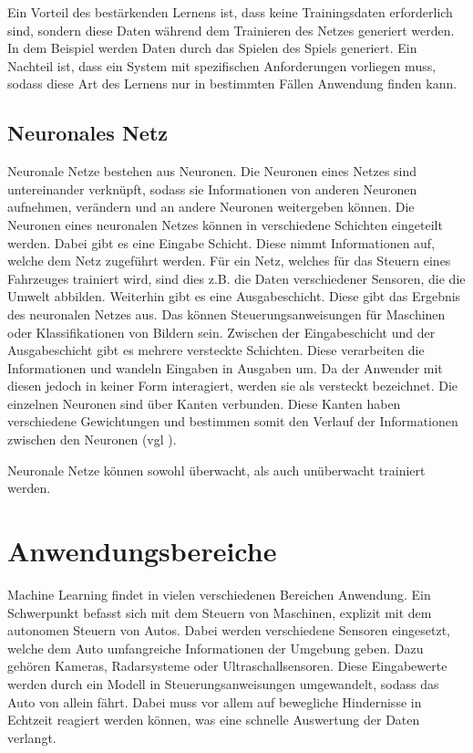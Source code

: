 Ein Vorteil des bestärkenden Lernens ist, dass keine Trainingsdaten erforderlich sind, sondern diese Daten während dem Trainieren des Netzes generiert werden. In dem Beispiel werden Daten durch das Spielen des Spiels generiert. Ein Nachteil ist, dass ein System mit spezifischen Anforderungen vorliegen muss, sodass diese Art des Lernens nur in bestimmten Fällen Anwendung finden kann.

\subsection{Neuronales Netz}
\label{neuronalesNetz}
Neuronale Netze bestehen aus Neuronen. Die Neuronen eines Netzes sind untereinander verknüpft, sodass sie Informationen von anderen Neuronen aufnehmen, verändern und an andere Neuronen weitergeben können. Die Neuronen eines neuronalen Netzes können in verschiedene Schichten eingeteilt werden. Dabei gibt es eine Eingabe Schicht. Diese nimmt Informationen auf, welche dem Netz zugeführt werden. Für ein Netz, welches für das Steuern eines Fahrzeuges trainiert wird, sind dies z.B. die Daten verschiedener Sensoren, die die Umwelt abbilden. Weiterhin gibt es eine Ausgabeschicht. Diese gibt das Ergebnis des neuronalen Netzes aus. Das können Steuerungsanweisungen für Maschinen oder Klassifikationen von Bildern sein. Zwischen der Eingabeschicht und der Ausgabeschicht gibt es mehrere versteckte Schichten. Diese verarbeiten die Informationen und wandeln Eingaben in Ausgaben um. Da der Anwender mit diesen jedoch in keiner Form interagiert, werden sie als versteckt bezeichnet. Die einzelnen Neuronen sind über Kanten verbunden. Diese Kanten haben verschiedene Gewichtungen und bestimmen somit den Verlauf der Informationen zwischen den Neuronen (vgl \cite[]{neuronalesNetz}).

Neuronale Netze können sowohl überwacht, als auch unüberwacht trainiert werden.

\section{Anwendungsbereiche}
\label{sec:anwendungsbereiche}
Machine Learning findet in vielen verschiedenen Bereichen Anwendung. Ein Schwerpunkt befasst sich mit dem Steuern von Maschinen, explizit mit dem autonomen Steuern von Autos. Dabei werden verschiedene Sensoren eingesetzt, welche dem Auto umfangreiche Informationen der Umgebung geben. Dazu gehören Kameras, Radarsysteme oder Ultraschallsensoren. Diese Eingabewerte werden durch ein Modell in Steuerungsanweisungen umgewandelt, sodass das Auto von allein fährt. Dabei muss vor allem auf bewegliche Hindernisse in Echtzeit reagiert werden können, was eine schnelle Auswertung der Daten verlangt.

